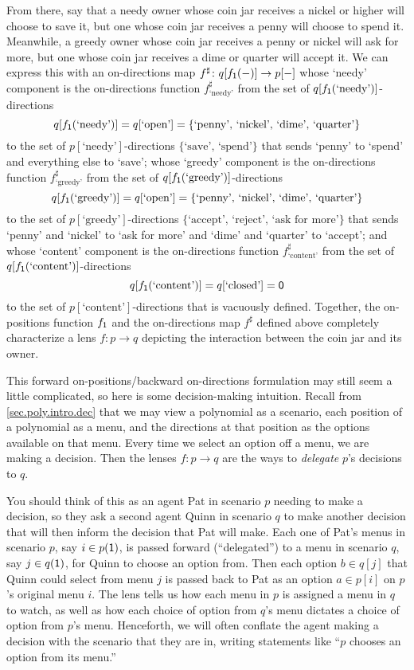 \documentclass[Book-Poly]{subfiles}
\begin{document}
\begin{example}
  From there, say that a needy owner whose coin jar receives a nickel or higher will choose to save it, but one whose coin jar receives a penny will choose to spend it.
  Meanwhile, a greedy owner whose coin jar receives a penny or nickel will ask for more, but one whose coin jar receives a dime or quarter will accept it.
  We can express this with an on-directions map $f^\sharp\colon q[f_{\textsf{1}}(-)]\to p[-]$ whose `needy' component is the on-directions function $f^\sharp_{\text{`needy'}}$ from the set of $q[f_{\textsf{1}}(\text{`needy'})]$-directions
  \[
    q[f_{\textsf{1}}(\text{`needy'})]=q[\text{`open'}]=\{\text{`penny', `nickel', `dime', `quarter'}\}
  \]
  to the set of $p[\text{`needy'}]$-directions $\{\text{`save', `spend'}\}$ that sends `penny' to `spend' and everything else to `save'; whose `greedy' component is the on-directions function $f^\sharp_{\text{`greedy'}}$ from the set of $q[f_{\textsf{1}}(\text{`greedy'})]$-directions
  \[
    q[f_{\textsf{1}}(\text{`greedy'})]=q[\text{`open'}]=\{\text{`penny', `nickel', `dime', `quarter'}\}
  \]
  to the set of $p[\text{`greedy'}]$-directions $\{\text{`accept', `reject', `ask for more'}\}$ that sends `penny' and `nickel' to `ask for more' and `dime' and `quarter' to `accept'; and whose `content' component is the on-directions function $f^\sharp_{\text{`content'}}$ from the set of $q[f_{\textsf{1}}(\text{`content'})]$-directions
  \[
    q[f_{\textsf{1}}(\text{`content'})]=q[\text{`closed'}]=\textsf{0}
  \]
  to the set of $p[\text{`content'}]$-directions that is vacuously defined.
  Together, the on-positions function $f_{\textsf{1}}$ and the on-directions map $f^\sharp$ defined above completely characterize a lens $f\colon p\to q$ depicting the interaction between the coin jar and its owner.
\end{example}

This forward on-positions/backward on-directions formulation may still seem a little complicated, so here is some decision-making intuition.
Recall from \cref{sec.poly.intro.dec} that we may view a polynomial as a scenario, each position of a polynomial as a menu, and the directions at that position as the options available on that menu.
Every time we select an option off a menu, we are making a decision.
Then the lenses $f\colon p\to q$ are the ways to \emph{delegate} $p$'s decisions to $q$.

You should think of this as an agent Pat in scenario $p$ needing to make a decision, so they ask a second agent Quinn in scenario $q$ to make another decision that will then inform the decision that Pat will make.
Each one of Pat's menus in scenario $p$, say $i\in p(\textsf{1})$, is passed forward (``delegated'') to a menu in scenario $q$, say $j\in q(\textsf{1})$, for Quinn to choose an option from.
Then each option $b\in q[j]$ that Quinn could select from menu $j$ is passed back to Pat as an option $a\in p[i]$ on $p$'s original menu $i$.
The lens tells us how each menu in $p$ is assigned a menu in $q$ to watch, as well as how each choice of option from $q$'s menu dictates a choice of option from $p$'s menu.
Henceforth, we will often conflate the agent making a decision with the scenario that they are in, writing statements like ``$p$ chooses an option from its menu.''
\end{document}
